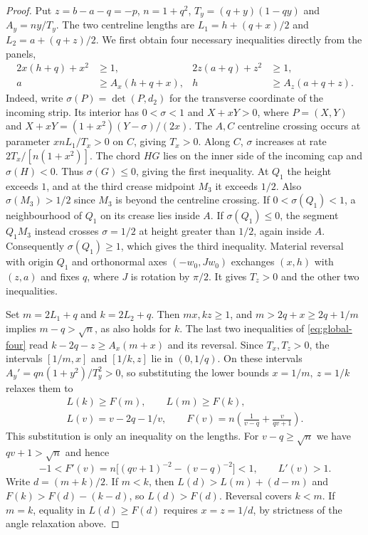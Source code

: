 \begin{proof}
Put $z=b-a-q=-p$, $n=1+q^2$, $T_y=(q+y)(1-qy)$ and $A_y=ny/T_y$. The two centreline lengths are $L_1=h+(q+x)/2$ and $L_2=a+(q+z)/2$. We first obtain four necessary inequalities directly from the panels,
\begin{equation}\label{eq:global-four}
\begin{aligned}
  2x(h+q)+x^2&\ge1, & 2z(a+q)+z^2&\ge1,\\
  a&\ge A_x(h+q+x), & h&\ge A_z(a+q+z).
\end{aligned}
\end{equation}
Indeed, write $\sigma(P)=\det(P,d_2)$ for the transverse coordinate of the incoming strip. Its interior has $0<\sigma<1$ and $X+xY>0$, where $P=(X,Y)$ and $X+xY=(1+x^2)(Y-\sigma)/(2x)$. The $A,C$ centreline crossing occurs at parameter $xnL_1/T_x>0$ on $C$, giving $T_x>0$. Along $C$, $\sigma$ increases at rate $2T_x/[n(1+x^2)]$. The chord $HG$ lies on the inner side of the incoming cap and $\sigma(H)<0$. Thus $\sigma(G)\le0$, giving the first inequality. At $Q_1$ the height exceeds $1$, and at the third crease midpoint $M_3$ it exceeds $1/2$. Also $\sigma(M_3)>1/2$ since $M_3$ is beyond the centreline crossing. If $0<\sigma(Q_1)<1$, a neighbourhood of $Q_1$ on its crease lies inside $A$. If $\sigma(Q_1)\le0$, the segment $Q_1M_3$ instead crosses $\sigma=1/2$ at height greater than $1/2$, again inside $A$. Consequently $\sigma(Q_1)\ge1$, which gives the third inequality. Material reversal with origin $Q_1$ and orthonormal axes $(-w_0,Jw_0)$ exchanges $(x,h)$ with $(z,a)$ and fixes $q$, where $J$ is rotation by $\pi/2$. It gives $T_z>0$ and the other two inequalities.

Set $m=2L_1+q$ and $k=2L_2+q$. Then $mx,kz\ge1$, and $m>2q+x\ge2q+1/m$ implies $m-q>\sqrt n$, as also holds for $k$. The last two inequalities of \eqref{eq:global-four} read $k-2q-z\ge A_x(m+x)$ and its reversal. Since $T_x,T_z>0$, the intervals $[1/m,x]$ and $[1/k,z]$ lie in $(0,1/q)$. On these intervals $A_y'=qn(1+y^2)/T_y^2>0$, so substituting the lower bounds $x=1/m,\ z=1/k$ relaxes them to
\[
 \begin{gathered}
 L(k)\ge F(m),\qquad L(m)\ge F(k),\\
 L(v)=v-2q-1/v,\qquad F(v)=n\left(\frac1{v-q}+\frac{v}{qv+1}\right).
 \end{gathered}
\]
This substitution is only an inequality on the lengths. For $v-q\ge\sqrt n$ we have $qv+1>\sqrt n$ and hence
\[
 -1<F'(v)=n\big[(qv+1)^{-2}-(v-q)^{-2}\big]<1,\qquad L'(v)>1 .
\]
Write $d=(m+k)/2$. If $m<k$, then $L(d)>L(m)+(d-m)$ and $F(k)>F(d)-(k-d)$, so $L(d)>F(d)$. Reversal covers $k<m$. If $m=k$, equality in $L(d)\ge F(d)$ requires $x=z=1/d$, by strictness of the angle relaxation above.


\end{proof}
